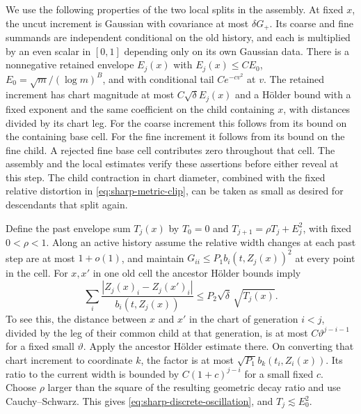 \documentclass[11pt]{article}
\newcommand{\1}{\mathbf{1}}
\numberwithin{equation}{section}
\begin{document}
We use the following properties of the two local splits in the
assembly. At fixed \(x\), the uncut increment is Gaussian with
covariance at most \(\delta G_+\). Its coarse and fine summands
are independent conditional on the old history, and each is
multiplied by an even scalar in \([0,1]\) depending only on
its own Gaussian data. There is a nonnegative retained envelope
\(E_j(x)\) with \(E_j(x)\le C E_0\), \(E_0=\sqrt m/(\log m)^B\),
and with conditional tail \(C e^{-c v^2}\) at \(v\).
The retained increment has chart magnitude at most
\(C\sqrt\delta E_j(x)\) and a Hölder bound with a fixed exponent
and the same coefficient on the child containing \(x\),
with distances divided by its chart leg. For the coarse
increment this follows from its bound on the containing base
cell. For the fine increment it follows from its bound on
the fine child. A rejected fine base cell contributes zero
throughout that cell. The assembly and the local estimates
verify these assertions before either reveal at this step.
The child contraction in chart diameter, combined with the
fixed relative distortion in \eqref{eq:sharp-metric-clip},
can be taken as small as desired for descendants that split
again.

Define the past envelope sum \(T_j(x)\) by \(T_0=0\) and
\(T_{j+1}=\rho T_j+E_j^2\), with fixed \(0<\rho<1\).
Along an active history assume the relative width changes
at each past step are at most \(1+o(1)\), and maintain
\(G_{ii}\le P_1 b_i(t,Z_j(x))^2\) at every point in the cell.
For \(x,x'\) in one old cell the ancestor Hölder bounds imply
\begin{equation}\label{eq:sharp-discrete-oscillation}
 \sum_i\frac{|Z_j(x)_i-Z_j(x')_i|}{b_i(t,Z_j(x))}
 \le P_2\sqrt\delta\,\sqrt{T_j(x)} .
\end{equation}
To see this, the distance between \(x\) and \(x'\) in the chart
of generation \(i<j\), divided by the leg of their common child
at that generation, is at most \(C\vartheta^{j-i-1}\) for a fixed
small \(\vartheta\). Apply the ancestor Hölder estimate there.
On converting that chart increment to coordinate \(k\),
the factor is at most \(\sqrt{P_1}b_k(t_i,Z_i(x))\).
Its ratio to the current width is bounded by
\(C(1+c)^{j-i}\) for a small fixed \(c\).
Choose \(\rho\) larger than the square of the resulting
geometric decay ratio and use Cauchy--Schwarz. This gives
\eqref{eq:sharp-discrete-oscillation}, and \(T_j\lesssim E_0^2\).
\end{document}
